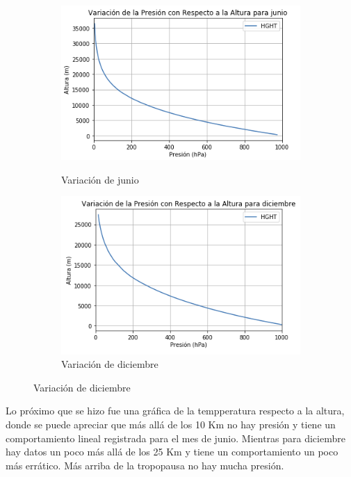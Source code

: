 \documentclass{article}
\begin{document}
\begin{figure}[h!]
\begin{subfigure}{.30\textwidth}
  \
  \includegraphics[width=.8\linewidth]{presion1.png}
  \caption{Variación de junio}
  \label{fig:sfig1}
\end{subfigure}
\begin{subfigure}{.30\textwidth}
  \left
  \includegraphics[width=.8\linewidth]{presion2.png}
  \caption{Variación de diciembre}
  \label{fig:sfig2}
\end{subfigure}
\end{figure}

Lo próximo que se hizo fue una gráfica de la tempperatura respecto a la altura, donde se puede apreciar que más allá de los 10 Km no hay presión y tiene un comportamiento lineal registrada para el mes de junio. Mientras para diciembre hay datos un poco más allá de los 25 Km y tiene un comportamiento un poco más errático. Más arriba de la tropopausa no hay mucha presión.

\newpage
\end{document}
